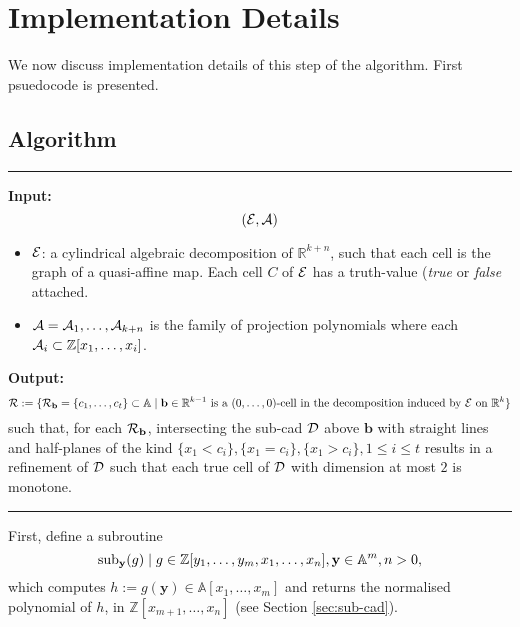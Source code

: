 \documentclass[
]{book}
\theoremstyle{definition}
\theoremstyle{definition}
\theoremstyle{definition}
\theoremstyle{definition}
\theoremstyle{remark}
\begin{document}
\hypertarget{implementation-details}{%
\section{Implementation Details}\label{implementation-details}}

We now discuss implementation details of this step of the algorithm. First psuedocode is presented.

\hypertarget{sec:monotone-algorithm}{%
\subsection{Algorithm}\label{sec:monotone-algorithm}}

\begin{center}\rule{0.5\linewidth}{0.5pt}\end{center}

\textbf{Input:}
\[({\cal E}, {\cal A})\]

\begin{itemize}
\item
  \(\cal E\): a cylindrical algebraic decomposition of \(\mathbb{R}^{k+n}\), such that each cell is the graph of a quasi-affine map. Each cell \(C\) of \(\cal E\) has a truth-value (\emph{true} or \emph{false} attached.
\item
  \({\cal A} = {\cal A}_1,\ldots,{\cal A}_{k+n}\) is the family of projection polynomials where each \({\cal A}_i \subset \mathbb{Z}[x_1,\ldots,x_i]\).
\end{itemize}

\textbf{Output:}
\[
{\cal R} := \{ {\cal R}_{\mathbf{b}} = \{ c_1,\ldots,c_t \} \subset \mathbb{A}\mid \mathbf{b} \in \mathbb{R}^{k-1} \text{ is a } (0,\ldots,0) \text{-cell in the decomposition induced by } {\cal E} \text{ on } \mathbb{R}^k \}
\]
such that, for each \({\cal R}_\mathbf{b}\), intersecting the sub-cad \(\cal D\) above \(\mathbf{b}\) with straight lines and half-planes of the kind \(\{x_1 < c_i \}, \{x_1 = c_i \}, \{x_1 > c_i\}, 1 \le i \le t\) results in a refinement of \(\cal D\) such that each true cell of \(\cal D\) with dimension at most \(2\) is monotone.

\begin{center}\rule{0.5\linewidth}{0.5pt}\end{center}

First, define a subroutine
\[{\rm sub}_{\mathbf{y}} (g) \mid g \in \mathbb{Z}[y_1,\ldots,y_m,x_1,\ldots,x_n], \mathbf{y} \in \mathbb{A}^m, n > 0,\]
which computes \(h := g(\mathbf{y}) \in \mathbb{A}[x_{1},\ldots,x_m]\) and returns the normalised polynomial of \(h\), in \(\mathbb{Z}[x_{m+1},\ldots,x_n]\) (see Section \ref{sec:sub-cad}).
\end{document}

